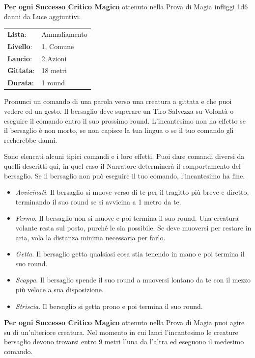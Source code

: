 \begin{multicols}{2}
\textbf{Per ogni Successo Critico Magico} ottenuto nella Prova di Magia infliggi 1d6 danni da Luce aggiuntivi.

\noindent\begin{tabularx}{\linewidth}{p{1.3cm}X}
	\rowcolor{gray!20}\textbf{Lista}: & Ammaliamento \\
	\textbf{Livello}: & 1, Comune \\
	\rowcolor{gray!20}\textbf{Lancio}: & 2 Azioni \\
	\textbf{Gittata}: & 18 metri \\
	\rowcolor{gray!20}\textbf{Durata}: & 1 round \\
\end{tabularx}\smallskip

Pronunci un comando di una parola verso una creatura a gittata e che puoi vedere ed un gesto. Il bersaglio deve superare un Tiro Salvezza su Volontà o eseguire il comando entro il suo prossimo round. L'incantesimo non ha effetto se il bersaglio è non morto, se non capisce la tua lingua o se il tuo comando gli recherebbe danni.

Sono elencati alcuni tipici comandi e i loro effetti. Puoi dare comandi diversi da quelli descritti qui, in quel caso il Narratore determinerà il comportamento del bersaglio. Se il bersaglio non può eseguire il tuo comando, l'incantesimo ha fine.

\begin{itemize}[leftmargin=*] \setlength{\itemsep}{0pt}
	\item \emph{Avvicinati}. Il bersaglio si muove verso di te per il tragitto più breve e diretto, terminando il suo round se si avvicina a 1 metro da te.
	\item \emph{Fermo}. Il bersaglio non si muove e poi termina il suo round. Una creatura volante resta sul posto, purché le sia possibile. Se deve muoversi per restare in aria, vola la distanza minima necessaria per farlo.
	\item \emph{Getta}. Il bersaglio getta qualsiasi cosa stia tenendo in mano e poi termina il suo round.
	\item \emph{Scappa}. Il bersaglio spende il suo round a muoversi lontano da te con il mezzo più veloce a sua disposizione.
	\item \emph{Striscia}. Il bersaglio si getta prono e poi termina il suo round.
\end{itemize}

\textbf{Per ogni Successo Critico Magico} ottenuto nella Prova di Magia puoi agire su di un'ulteriore creatura. Nel momento in cui lanci l'incantesimo le creature bersaglio devono trovarsi entro 9 metri l'una da l'altra ed eseguono il medesimo comando.


\end{multicols}
